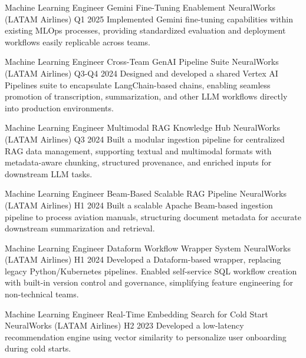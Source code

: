 \begin{cventries}

    \cventry
    {Machine Learning Engineer}
    {Gemini Fine-Tuning Enablement}
    {NeuralWorks (LATAM Airlines)}
    {Q1 2025}
    {Implemented Gemini fine-tuning capabilities within existing MLOps processes, providing standardized evaluation and deployment workflows easily replicable across teams.}

    \cventry
    {Machine Learning Engineer}
    {Cross-Team GenAI Pipeline Suite}
    {NeuralWorks (LATAM Airlines)}
    {Q3-Q4 2024}
    {Designed and developed a shared Vertex AI Pipelines suite to encapsulate LangChain-based chains, enabling seamless promotion of transcription, summarization, and other LLM workflows directly into production environments.}

    \cventry
    {Machine Learning Engineer}
    {Multimodal RAG Knowledge Hub}
    {NeuralWorks (LATAM Airlines)}
    {Q3 2024}
    {Built a modular ingestion pipeline for centralized RAG data management, supporting textual and multimodal formats with metadata-aware chunking, structured provenance, and enriched inputs for downstream LLM tasks.}

    \cventry
    {Machine Learning Engineer}
    {Beam-Based Scalable RAG Pipeline}
    {NeuralWorks (LATAM Airlines)}
    {H1 2024}
    {Built a scalable Apache Beam-based ingestion pipeline to process aviation manuals, structuring document metadata for accurate downstream summarization and retrieval.}

    \cventry
    {Machine Learning Engineer}
    {Dataform Workflow Wrapper System}
    {NeuralWorks (LATAM Airlines)}
    {H1 2024}
    {Developed a Dataform-based wrapper, replacing legacy Python/Kubernetes pipelines. Enabled self-service SQL workflow creation with built-in version control and governance, simplifying feature engineering for non-technical teams.}

    \cventry
    {Machine Learning Engineer}
    {Real-Time Embedding Search for Cold Start}
    {NeuralWorks (LATAM Airlines)}
    {H2 2023}
    {Developed a low-latency recommendation engine using vector similarity to personalize user onboarding during cold starts.}

\end{cventries}
